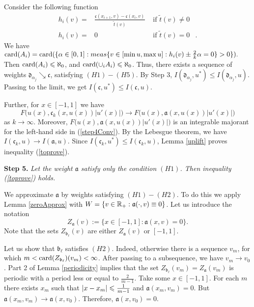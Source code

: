 Consider the following function
$$
\begin{aligned}
h_i(v) = & \frac{\mathfrak c(x_{i + 1}, v) - \mathfrak c(x_i, v)}{\tilde{t} (v)} & \text{ if } \tilde{t} (v) \neq 0 & \\
h_i(v) = & 0 & \text{ if } \tilde{t} (v) = 0 &.
\end{aligned}
$$
We have $\card(A_i) = \card(\{ \alpha \in [0, 1]: meas \{ v \in [\min u, \max u]: h_i(v) \pm \frac{2}{k} \alpha = 0 \} > 0 \}).$
Then ${\rm card}(A_i) \leqslant \aleph_0$, and ${\rm card}(\cup_i A_i) \leqslant \aleph_0$.
Thus, there exists a sequence of weights $\mathfrak d_{\alpha_j} \searrow \mathfrak c$, satisfying $(H1)-(H5)$.
By Step 3, $I(\mathfrak d_{\alpha_j}, u^*) \le I(\mathfrak d_{\alpha_j}, u)$.
Passing to the limit, we get $I(\mathfrak c, u^*) \le I(\mathfrak c, u)$.

Further, for $x \in [-1, 1]$ we have
\begin{equation}
\label{step4Conv}
F\big(u(x), \mathfrak c_k(x, u(x)) |u'(x)|\big) \to F\big(u(x), \mathfrak a(x, u(x)) |u'(x)|\big)
\end{equation}
as $k \to \infty$.
Moreover, $F\big(u(x), \mathfrak a(x, u(x)) |u'(x)|\big)$ is an integrable majorant
for the left-hand side in (\ref{step4Conv}).
By the Lebesgue theorem, we have $I(\mathfrak c_k, u) \to I(\mathfrak a, u)$.
Since $I(\mathfrak c_k, u^*) \le I(\mathfrak c_k, u)$, Lemma \ref{uplift} proves inequality (\ref{toprove}).

\bigskip
{\bf Step 5.} {\it Let the weight $\mathfrak a$ satisfy only the condition $(H1)$.
Then inequality (\ref{toprove}) holds.}

We approximate $\mathfrak a$ by weights satisfying $(H1)-(H2)$.
To do this we apply Lemma \ref{zeroApprox} with $W = \{ v \in \mathbb R_+: \mathfrak a(\cdot, v) \equiv 0 \}$.
Let us introduce the notation $$Z_{\mathfrak a}(v) := \{ x \in [-1, 1]: \mathfrak a(x, v) = 0 \}.$$
Note that the sets $Z_{\mathfrak b_{\ell}}(v)$ are either $Z_{\mathfrak a}(v)$ or $[-1, 1]$.

Let us show that $\mathfrak b_{\ell}$ satisfies $(H2)$.
Indeed, otherwise there is a sequence $v_m$, for which
$m < {\rm card}(Z_{\mathfrak b_{\ell}})(v_m) < \infty$.
After passing to a subsequence, we have $v_m \to v_0$.
Part 2 of Lemma \ref{periodicity} implies that the set $Z_{\mathfrak b_{\ell}}(v_m) = Z_{\mathfrak a}(v_m)$
is periodic with a period less or equal to $\frac{2}{m - 1}$.
Take some $x \in [-1, 1]$. For each $m$ there exists $x_m$ such that
$\abs{x - x_m} \le \frac{1}{m - 1}$ and $\mathfrak a(x_m, v_m) = 0$.
But $\mathfrak a(x_m, v_m) \to \mathfrak a(x, v_0)$.
Therefore, $\mathfrak a(x, v_0) = 0$.

